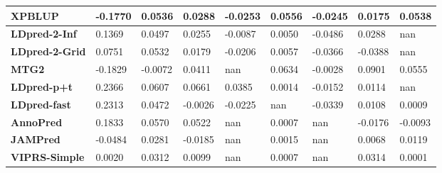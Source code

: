 \documentclass[pdflatex,sn-basic]{sn-jnl}
\begin{document}
\begin{table}[!ht]
{\begin{tabular}{|l|l|l|l|l|l|l|l|l|}
\hline
\textbf{XPBLUP} & \cellcolor[HTML]{F98871}-0.1770 & \cellcolor[HTML]{88C97E}0.0536 & \cellcolor[HTML]{FFEB84}0.0288 & \cellcolor[HTML]{FBA175}-0.0253 & \cellcolor[HTML]{93CC7E}0.0556 & \cellcolor[HTML]{FFEB84}-0.0245 & \cellcolor[HTML]{EEE683}0.0175 & \cellcolor[HTML]{77C47D}0.0538 \\
\hline
\textbf{LDpred-2-Inf} & \cellcolor[HTML]{D1DE82}0.1369 & \cellcolor[HTML]{9DCF7F}0.0497 & \cellcolor[HTML]{FEE482}0.0255 & \cellcolor[HTML]{FEDF81}-0.0087 & \cellcolor[HTML]{FEEA83}0.0050 & \cellcolor[HTML]{FCB579}-0.0486 & \cellcolor[HTML]{D8E082}0.0288 & nan \\
\hline
\textbf{LDpred-2-Grid} & \cellcolor[HTML]{FEE983}0.0751 & \cellcolor[HTML]{8ACA7E}0.0532 & \cellcolor[HTML]{FDD67F}0.0179 & \cellcolor[HTML]{FCB379}-0.0206 & \cellcolor[HTML]{FEEA83}0.0057 & \cellcolor[HTML]{FDD07E}-0.0366 & \cellcolor[HTML]{F98871}-0.0388 & nan \\
\hline
\textbf{MTG2} & \cellcolor[HTML]{F98670}-0.1829 & \cellcolor[HTML]{FA9573}-0.0072 & \cellcolor[HTML]{E8E583}0.0411 & nan & \cellcolor[HTML]{81C77D}0.0634 & \cellcolor[HTML]{C9DC81}-0.0028 & \cellcolor[HTML]{64BF7C}0.0901 & \cellcolor[HTML]{73C37C}0.0555 \\
\hline
\textbf{LDpred-p+t} & \cellcolor[HTML]{81C77D}0.2366 & \cellcolor[HTML]{63BE7B}0.0607 & \cellcolor[HTML]{B9D780}0.0661 & \cellcolor[HTML]{63BE7B}0.0385 & \cellcolor[HTML]{FEE883}0.0014 & \cellcolor[HTML]{E8E583}-0.0152 & \cellcolor[HTML]{F9EA84}0.0114 & nan \\
\hline
\textbf{LDpred-fast} & \cellcolor[HTML]{86C87D}0.2313 & \cellcolor[HTML]{AAD380}0.0472 & \cellcolor[HTML]{FBAE78}-0.0026 & \cellcolor[HTML]{FBAC77}-0.0225 & nan & \cellcolor[HTML]{FDD680}-0.0339 & \cellcolor[HTML]{FAEA84}0.0108 & \cellcolor[HTML]{FEEB84}0.0009 \\
\hline
\textbf{AnnoPred} & \cellcolor[HTML]{ACD380}0.1833 & \cellcolor[HTML]{77C47D}0.0570 & \cellcolor[HTML]{D3DF82}0.0522 & nan & \cellcolor[HTML]{FEE883}0.0007 & nan & \cellcolor[HTML]{FCB579}-0.0176 & \cellcolor[HTML]{FBAC78}-0.0093 \\
\hline
\textbf{JAMPred} & \cellcolor[HTML]{FCBA7A}-0.0484 & \cellcolor[HTML]{FEE582}0.0281 & \cellcolor[HTML]{FA9072}-0.0185 & nan & \cellcolor[HTML]{FEE883}0.0015 & nan & \cellcolor[HTML]{FEE883}0.0068 & \cellcolor[HTML]{E2E383}0.0119 \\
\hline
\textbf{VIPRS-Simple} & \cellcolor[HTML]{FDCD7E}0.0020 & \cellcolor[HTML]{FDEB84}0.0312 & \cellcolor[HTML]{FDC67D}0.0099 & nan & \cellcolor[HTML]{FEE883}0.0007 & nan & \cellcolor[HTML]{D3DF82}0.0314 & \cellcolor[HTML]{FEEA83}0.0001 \\

\end{tabular}}
\end{table}
\end{document}
